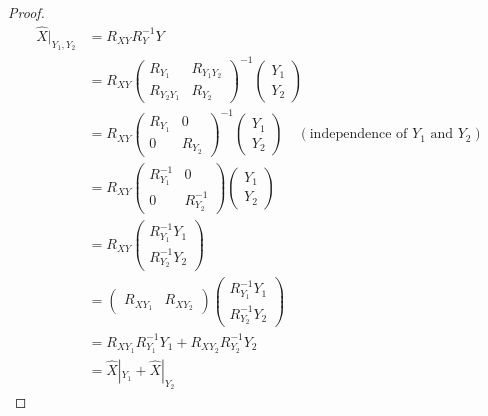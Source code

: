 \documentclass[a4 paper]{article}
\numberwithin{equation}{section}
\theoremstyle{boldStyle}
\theoremstyle{boldBlueStyle}
\theoremstyle{boldPurpleStyle}
\theoremstyle{boldRedStyle}
\theoremstyle{boldGreenStyle}
\begin{document}
\begin{proof}
  \begin{align*}
    \hat{X}|_{Y_1, Y_2} &= R_{XY} R_Y^{-1} Y \\
    &= R_{XY} 
    \begin{pmatrix}
    R_{Y_1} & R_{Y_1 Y_2} \\
    R_{Y_2 Y_1} & R_{Y_2}
    \end{pmatrix}^{-1}
    \begin{pmatrix}
    Y_1 \\
    Y_2
    \end{pmatrix} \\
    &= R_{XY} 
    \begin{pmatrix}
    R_{Y_1} & 0 \\
    0 & R_{Y_2}
    \end{pmatrix}^{-1}
    \begin{pmatrix}
    Y_1 \\
    Y_2
    \end{pmatrix} \quad (\text{independence of } Y_1 \text{ and } Y_2) \\
    &= R_{XY}
    \begin{pmatrix}
    R_{Y_1}^{-1} & 0 \\
    0 & R_{Y_2}^{-1}
    \end{pmatrix}
    \begin{pmatrix}
    Y_1 \\
    Y_2
    \end{pmatrix} \\
    &= R_{XY}
    \begin{pmatrix}
    R_{Y_1}^{-1} Y_1 \\
    R_{Y_2}^{-1} Y_2
    \end{pmatrix} \\
    &= \begin{pmatrix}
    R_{XY_1} & R_{XY_2}
    \end{pmatrix}
    \begin{pmatrix}
    R_{Y_1}^{-1} Y_1 \\
    R_{Y_2}^{-1} Y_2
    \end{pmatrix} \\
    &= R_{XY_1} R_{Y_1}^{-1} Y_1 + R_{XY_2} R_{Y_2}^{-1} Y_2 \\
    &= \hat{X}|_{Y_1} + \hat{X}|_{Y_2}
  \end{align*}
\end{proof}
\end{document}

